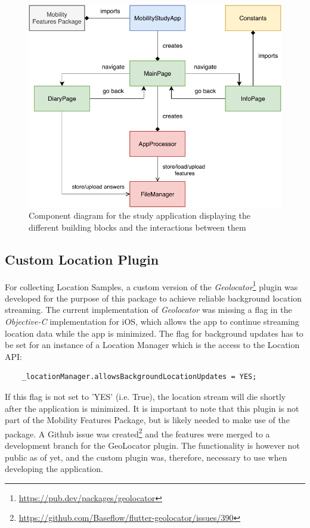 \begin{figure}
    \centering
    \includegraphics[width=\textwidth]{images/diagrams/app-diagram.pdf}
    \caption{Component diagram for the study application displaying the different building blocks and the interactions between them}
    \label{fig:app-component-diagram}
\end{figure}

\subsection{Custom Location Plugin}
For collecting Location Samples, a custom version of the \textit{Geolocator}\footnote{\url{https://pub.dev/packages/geolocator}} plugin was developed for the purpose of this package to achieve reliable background location streaming. The current implementation of \textit{Geolocator} was missing a flag in the \textit{Objective-C} implementation for iOS, which allows the app to continue streaming location data while the app is minimized. The flag for background updates has to be set for an instance of a Location Manager which is the access to the Location API:

\begin{verbatim}
    _locationManager.allowsBackgroundLocationUpdates = YES;
\end{verbatim}

If this flag is not set to 'YES' (i.e. True), the location stream will die shortly after the application is minimized. It is important to note that this plugin is not part of the Mobility Features Package, but is likely needed to make use of the package. A Github issue was created\footnote{\url{https://github.com/Baseflow/flutter-geolocator/issues/390}} and the features were merged to a development branch for the GeoLocator plugin. The functionality is however not public as of yet, and the custom plugin was, therefore, necessary to use when developing the application. 

